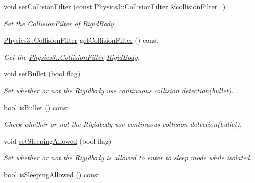 \begin{DoxyCompactItemize}
void \hyperlink{class_i_dream_sky_1_1_physics3_1_1_rigid_body_aec6c6c3d392567f7c0ee2a9857b4c49d}{set\+Collision\+Filter} (const \hyperlink{class_i_dream_sky_1_1_physics3_1_1_collision_filter}{Physics3\+::\+Collision\+Filter} \&collision\+Filter\+\_\+)
\begin{DoxyCompactList}\small\item\em Set the \hyperlink{class_i_dream_sky_1_1_physics3_1_1_collision_filter}{Collision\+Filter} of \hyperlink{class_i_dream_sky_1_1_physics3_1_1_rigid_body}{Rigid\+Body}. \end{DoxyCompactList}\item 
\hyperlink{class_i_dream_sky_1_1_physics3_1_1_collision_filter}{Physics3\+::\+Collision\+Filter} \hyperlink{class_i_dream_sky_1_1_physics3_1_1_rigid_body_aead253bff5342b09fb8705edf553ca98}{get\+Collision\+Filter} () const 
\begin{DoxyCompactList}\small\item\em Get the \hyperlink{class_i_dream_sky_1_1_physics3_1_1_collision_filter}{Physics3\+::\+Collision\+Filter} \hyperlink{class_i_dream_sky_1_1_physics3_1_1_rigid_body}{Rigid\+Body}. \end{DoxyCompactList}\item 
void \hyperlink{class_i_dream_sky_1_1_physics3_1_1_rigid_body_a1fa821b799126307734a48d72aa2cd6c}{set\+Bullet} (bool flag)
\begin{DoxyCompactList}\small\item\em Set whether or not the Rigidbody use continuous collision detection(bullet). \end{DoxyCompactList}\item 
bool \hyperlink{class_i_dream_sky_1_1_physics3_1_1_rigid_body_a7ee7b6fe98fb29804fa4f1731f30994c}{is\+Bullet} () const 
\begin{DoxyCompactList}\small\item\em Check whether or not the Rigidbody use continuous collision detection(bullet). \end{DoxyCompactList}\item 
void \hyperlink{class_i_dream_sky_1_1_physics3_1_1_rigid_body_a06fadd5ade78b67db587fb0ee8b02ae3}{set\+Sleeping\+Allowed} (bool flag)
\begin{DoxyCompactList}\small\item\em Set whether or not the Rigidbody is allowed to enter to sleep mode while isolated. \end{DoxyCompactList}\item 
bool \hyperlink{class_i_dream_sky_1_1_physics3_1_1_rigid_body_a3629376b3a74724684ea012f9d0412e9}{is\+Sleeping\+Allowed} () const 

\end{DoxyCompactItemize}
